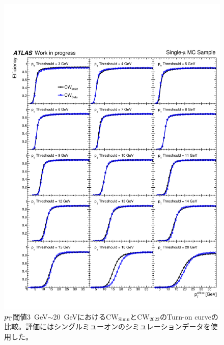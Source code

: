 \begin{figure}[p]
  \centering
  \includegraphics[clip, width=14cm]{fig/5/c2.pdf}
  \caption{$p_{\rm{T}}$閾値3~GeV$\sim$20~GeVにおける$\mathrm{CW_{Simu}}$と$\mathrm{CW_{2022}}$のTurn-on curveの比較。評価にはシングルミューオンのシミュレーションデータを使用した。}
  \label{fig:v05v07_1_9_Simu}
\end{figure}




